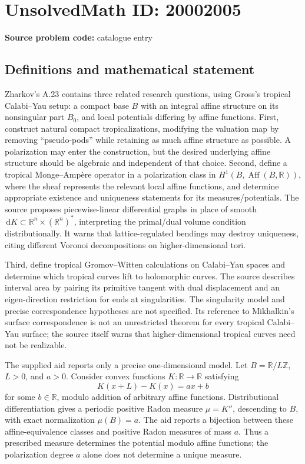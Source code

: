 \documentclass[11pt]{article}
\newcommand{\Z}{\mathbb{Z}}
\newcommand{\R}{\mathbb{R}}
\newcommand{\dd}{\,\mathrm{d}}
\begin{document}
\section*{UnsolvedMath ID: 20002005}
\textbf{Source problem code:} catalogue entry
\subsection{Definitions and mathematical statement}
Zharkov's A.23 contains three related research questions, using Gross's tropical Calabi--Yau setup: a compact base \(B\) with an integral affine structure on its nonsingular part \(B_0\), and local potentials differing by affine functions. First, construct natural compact tropicalizations, modifying the valuation map by removing ``pseudo-pods'' while retaining as much affine structure as possible. A polarization may enter the construction, but the desired underlying affine structure should be algebraic and independent of that choice. Second, define a tropical Monge--Amp\`ere operator in a polarization class in \(H^1(B,\operatorname{Aff}(B,\R))\), where the sheaf represents the relevant local affine functions, and determine appropriate existence and uniqueness statements for its measures/potentials. The source proposes piecewise-linear differential graphs in place of smooth \(\dd K\subset\R^n\times(\R^n)^*\), interpreting the primal/dual volume condition distributionally. It warns that lattice-regulated bendings may destroy uniqueness, citing different Voronoi decompositions on higher-dimensional tori.

Third, define tropical Gromov--Witten calculations on Calabi--Yau spaces and determine which tropical curves lift to holomorphic curves. The source describes interval area by pairing its primitive tangent with dual displacement and an eigen-direction restriction for ends at singularities. The singularity model and precise correspondence hypotheses are not specified. Its reference to Mikhalkin's surface correspondence is not an unrestricted theorem for every tropical Calabi--Yau surface; the source itself warns that higher-dimensional tropical curves need not be realizable.

The supplied aid reports only a precise one-dimensional model. Let \(B=\R/L\Z\), \(L>0\), and \(a>0\). Consider convex functions \(K:\R\to\R\) satisfying
\[
K(x+L)-K(x)=ax+b
\]
for some \(b\in\R\), modulo addition of arbitrary affine functions. Distributional differentiation gives a periodic positive Radon measure \(\mu=K''\), descending to \(B\), with exact normalization \(\mu(B)=a\). The aid reports a bijection between these affine-equivalence classes and positive Radon measures of mass \(a\). Thus a prescribed measure determines the potential modulo affine functions; the polarization degree \(a\) alone does not determine a unique measure.
\end{document}

